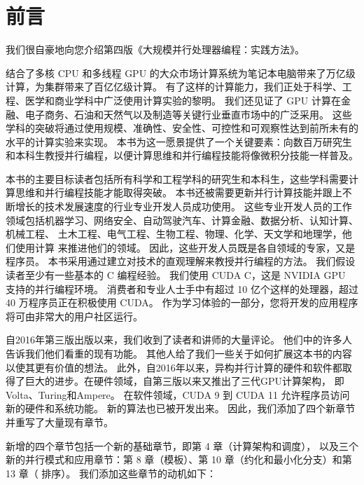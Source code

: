 \section*{前言}
我们很自豪地向您介绍第四版《大规模并行处理器编程：实践方法》。

结合了多核 CPU 和多线程 GPU 的大众市场计算系统为笔记本电脑带来了万亿级计算，为集群带来了百亿亿级计算。 
有了这样的计算能力，我们正处于科学、工程、医学和商业学科中广泛使用计算实验的黎明。 
我们还见证了 GPU 计算在金融、电子商务、石油和天然气以及制造等关键行业垂直市场中的广泛采用。 
这些学科的突破将通过使用规模、准确性、安全性、可控性和可观察性达到前所未有的水平的计算实验来实现。 
本书为这一愿景提供了一个关键要素：向数百万研究生和本科生教授并行编程，以便计算思维和并行编程技能将像微积分技能一样普及。

本书的主要目标读者包括所有科学和工程学科的研究生和本科生，这些学科需要计算思维和并行编程技能才能取得突破。 
本书还被需要更新并行计算技能并跟上不断增长的技术发展速度的行业专业开发人员成功使用。 
这些专业开发人员的工作领域包括机器学习、网络安全、自动驾驶汽车、计算金融、数据分析、认知计算、机械工程、
土木工程、电气工程、生物工程、物理、化学、天文学和地理学，他们使用计算 来推进他们的领域。 
因此，这些开发人员既是各自领域的专家，又是程序员。 本书采用通过建立对技术的直观理解来教授并行编程的方法。 
我们假设读者至少有一些基本的 C 编程经验。 我们使用 CUDA C，这是 NVIDIA GPU 支持的并行编程环境。 
消费者和专业人士手中有超过 10 亿个这样的处理器，超过 40 万程序员正在积极使用 CUDA。 
作为学习体验的一部分，您将开发的应用程序将可由非常大的用户社区运行。

自2016年第三版出版以来，我们收到了读者和讲师的大量评论。 他们中的许多人告诉我们他们看重的现有功能。 
其他人给了我们一些关于如何扩展这本书的内容以使其更有价值的想法。 
此外，自2016年以来，异构并行计算的硬件和软件都取得了巨大的进步。在硬件领域，自第三版以来又推出了三代GPU计算架构，
即Volta、Turing和Ampere。 在软件领域，CUDA 9 到 CUDA 11 允许程序员访问新的硬件和系统功能。 
新的算法也已被开发出来。 因此，我们添加了四个新章节并重写了大量现有章节。

新增的四个章节包括一个新的基础章节，即第 4 章（计算架构和调度），
以及三个新的并行模式和应用章节：第 8 章（模板）、第 10 章（约化和最小化分支）和第 13 章（ 排序）。 
我们添加这些章节的动机如下：

